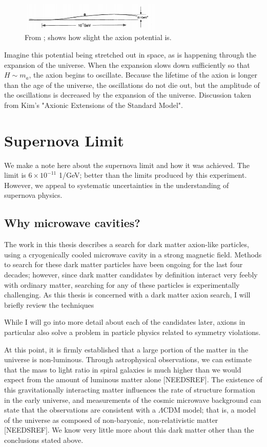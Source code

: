 \documentclass[12pt,twosides]{book}
\begin{document}
\begin{figure}
\includegraphics[width=0.6\textwidth]{axionpotential}
\caption{From \cite{kim95}; shows how slight the axion potential is.}
\end{figure}

Imagine this potential being stretched out in space, as is happening through the expansion of the universe. When the expansion slows down sufficiently so that $H \sim m_a$, the axion begins to oscillate. Because the lifetime of the axion is longer than the age of the universe, the oscillations do not die out, but the amplitude of the oscillations is decreased by the expansion of the universe. Discussion taken from Kim's "Axionic Extensions of the Standard Model".

\section{Supernova Limit}

We make a note here about the supernova limit and how it was achieved. The limit is $6 \times 10^{-11}$ 1/GeV; better than the limits produced by this experiment. However, we appeal to systematic uncertainties in the understanding of supernova physics.

\subsection{Why microwave cavities?}
The work in this thesis describes a search for dark matter axion-like particles, using a cryogenically cooled microwave cavity in a strong magnetic field. Methods to search for these dark matter particles have been ongoing for the last four decades; however, since dark matter candidates by definition interact very feebly with ordinary matter, searching for any of these particles is experimentally challenging.  As this thesis is concerned with a dark matter axion search, I will briefly review the techniques



While I will go into more detail about each of the candidates later, axions in particular also solve a problem in particle physics related to symmetry violations. 




At this point, it is firmly established that a large portion of the matter in the universe is non-luminous. Through astrophysical observations, we can estimate that the mass to light ratio in spiral galaxies is much higher than we would expect from the amount of luminous matter alone [NEEDSREF]. The existence of this gravitationally interacting matter influences the rate of structure formation in the early universe, and measurements of the cosmic microwave background can state that the observations are consistent with a $\Lambda$CDM model; that is, a model of the universe as composed of non-baryonic, non-relativistic matter [NEEDSREF]. We know very little more about this dark matter other than the conclusions stated above.
\end{document}
